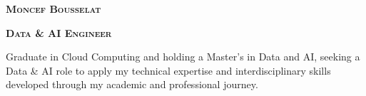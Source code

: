 \documentclass[letterpaper,12t]{article}
\begin{document}

\begin{center}
    \begin{minipage}[c]{0.17\textwidth}
        \centering
        \setlength{\fboxsep}{0.1pt}
        \setlength{\fboxrule}{2pt}
    \end{minipage}
    \hfill
    \begin{minipage}[c]{0.8\textwidth}
        \textbf{\LARGE \scshape Moncef Bousselat}
        \vspace{3pt}
    
        \textbf{\large \scshape Data \& AI Engineer}
        \vspace{5pt}

        \begin{minipage}{\textwidth}
            \justifying \small \noindent
            Graduate in Cloud Computing and holding a Master's in Data and AI, seeking a
            Data \& AI role to apply my technical expertise and interdisciplinary 
            skills developed through my academic and professional journey.
        \end{minipage}


\end{minipage}
\end{center}
\end{document}
